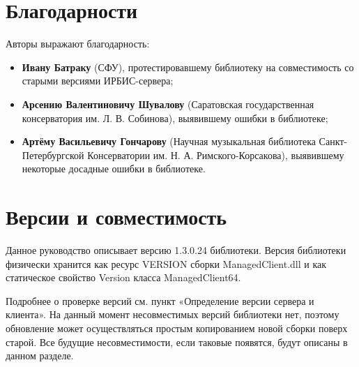 \section*{Благодарности}

Авторы выражают благодарность:

\begin{itemize}
	\item \textbf{Ивану Батраку} (СФУ), протестировавшему библиотеку на совместимость со старыми версиями ИРБИС-сервера;
	\item \textbf{Арсению Валентиновичу Шувалову} (Саратовская государственная консерватория им. Л. В. Собинова), выявившему ошибки в библиотеке;
	\item \textbf{Артёму Васильевичу Гончарову} (Научная музыкальная библиотека Санкт-Петер\-бургской Консерватории им. Н. А. Римского-Корсакова), выявившему некоторые досадные ошибки в библиотеке.
\end{itemize}

\section*{Версии и совместимость}

Данное руководство описывает версию 1.3.0.24 библиотеки. Версия библиотеки физически хранится как ресурс VERSION сборки ManagedClient.dll и как статическое свойство Version класса ManagedClient64.

Подробнее о проверке версий см. пункт «Определение версии сервера и клиента».
На данный момент несовместимых версий библиотеки нет, поэтому обновление может осуществляться простым копированием новой сборки поверх старой.
Все будущие несовместимости, если таковые появятся, будут описаны в данном разделе.


